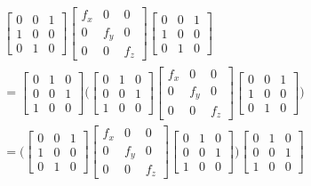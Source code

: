 \documentclass{article}      %
\begin{document}
\begin{multline*}
\begin{bmatrix}
0 & 0 & 1 \\
1 & 0 & 0 \\
0 & 1 & 0
\end{bmatrix}
\begin{bmatrix}
f_x & 0 & 0 \\
0 & f_y & 0 \\
0 & 0 & f_z
\end{bmatrix}
\begin{bmatrix}
0 & 0 & 1 \\
1 & 0 & 0 \\
0 & 1 & 0
\end{bmatrix} \\
=
\begin{bmatrix}
0 & 1 & 0 \\
0 & 0 & 1 \\
1 & 0 & 0
\end{bmatrix}
\Biggl(
\begin{bmatrix}
0 & 1 & 0 \\
0 & 0 & 1 \\
1 & 0 & 0
\end{bmatrix}
\begin{bmatrix}
f_x & 0 & 0 \\
0 & f_y & 0 \\
0 & 0 & f_z
\end{bmatrix}
\begin{bmatrix}
0 & 0 & 1 \\
1 & 0 & 0 \\
0 & 1 & 0
\end{bmatrix}
\Biggr) \\
=
\Biggl(
\begin{bmatrix}
0 & 0 & 1 \\
1 & 0 & 0 \\
0 & 1 & 0
\end{bmatrix}
\begin{bmatrix}
f_x & 0 & 0 \\
0 & f_y & 0 \\
0 & 0 & f_z
\end{bmatrix}
\begin{bmatrix}
0 & 1 & 0 \\
0 & 0 & 1 \\
1 & 0 & 0
\end{bmatrix}
\Biggr)
\begin{bmatrix}
0 & 1 & 0 \\
0 & 0 & 1 \\
1 & 0 & 0
\end{bmatrix}
\end{multline*}
\end{document}
